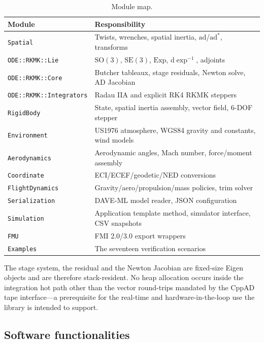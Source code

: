 \documentclass[preprint,12pt,a4paper]{elsarticle}
\newcommand{\SO}{\mathrm{SO}(3)}
\newcommand{\SE}{\mathrm{SE}(3)}
\newcommand{\Exp}{\mathrm{Exp}}
\newcommand{\dexp}{\mathrm{d}\exp}
\newcommand{\ad}{\mathrm{ad}}
\newcommand{\code}[1]{\texttt{\small #1}}
\begin{document}
\begin{table}[!h]
  \centering
  \caption{Module map.}
  \label{tab:modules}
  \footnotesize
  \begin{tabular}{@{}lp{8.4cm}@{}}
    \toprule
    Module & Responsibility \\
    \midrule
    \code{Spatial}        & Twists, wrenches, spatial inertia, $\ad$/$\ad^*$, transforms \\
    \code{ODE::RKMK::Lie} & $\SO$, $\SE$, $\Exp$, $\dexp^{-1}$, adjoints \\
    \code{ODE::RKMK::Core} & Butcher tableaux, stage residuals, Newton solve, AD Jacobian \\
    \code{ODE::RKMK::Integrators} & Radau IIA and explicit RK4 RKMK steppers \\
    \code{RigidBody}      & State, spatial inertia assembly, vector field, 6-DOF stepper \\
    \code{Environment}    & US1976 atmosphere, WGS84 gravity and constants, wind models \\
    \code{Aerodynamics}   & Aerodynamic angles, Mach number, force/moment assembly \\
    \code{Coordinate}     & ECI/ECEF/geodetic/NED conversions \\
    \code{FlightDynamics} & Gravity/aero/propulsion/mass policies, trim solver \\
    \code{Serialization}  & DAVE-ML model reader, JSON configuration \\
    \code{Simulation}     & Application template method, simulator interface, CSV snapshots \\
    \code{FMU}            & FMI 2.0/3.0 export wrappers \\
    \code{Examples}       & The seventeen verification scenarios \\
    \bottomrule
  \end{tabular}
\end{table}

The stage system, the residual and the Newton Jacobian are fixed-size Eigen
objects and are therefore stack-resident. No heap allocation occurs inside the
integration hot path other than the vector round-trips mandated by the CppAD
tape interface---a prerequisite for the real-time and hardware-in-the-loop use
the library is intended to support.

\subsection{Software functionalities}
\label{sec:functionalities}
\end{document}
